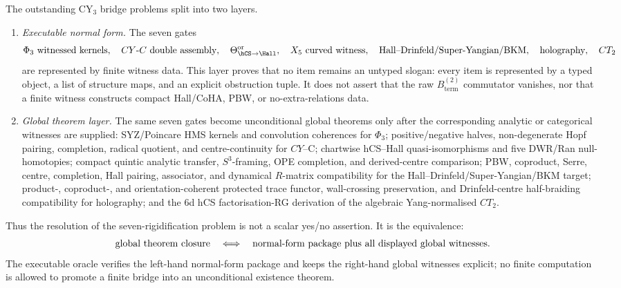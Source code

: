 \begin{proposition}
\label{prop:cy3-seven-bridge-normal-form}
The outstanding CY$_3$ bridge problems split into two layers.
\begin{enumerate}[label=\textup{(\roman*)}]
\item \emph{Executable normal form.} The seven gates
\[
\Phi_3\textup{ witnessed kernels},\quad
CY\textup{-}C\textup{ double assembly},\quad
\Theta_{\hCS\to\Hall}^{\mathrm{or}},\quad
X_5\textup{ curved witness},\quad
\textup{Hall--Drinfeld/Super-Yangian/BKM},\quad
\textup{holography},\quad
CT_2
\]
are represented by finite witness data. This layer proves that
no item remains an untyped slogan: every item is represented by a
typed object, a list of structure maps, and an explicit obstruction
tuple. It does not assert that the raw
$B_{\mathrm{term}}^{(2)}$ commutator vanishes, nor that a finite witness
constructs compact Hall/CoHA, PBW, or no-extra-relations data.
\item \emph{Global theorem layer.} The same seven gates become
unconditional global theorems only after the corresponding analytic or
categorical witnesses are supplied: SYZ/Poincare HMS kernels and
convolution coherences for $\Phi_3$; positive/negative halves,
non-degenerate Hopf pairing, completion, radical quotient, and
centre-continuity for $CY$--C; chartwise hCS--Hall quasi-isomorphisms
and five DWR/Ran null-homotopies; compact quintic analytic transfer,
$S^3$-framing, OPE completion, and derived-centre comparison; PBW,
coproduct, Serre, centre, completion, Hall pairing, associator, and
dynamical $R$-matrix compatibility for the
Hall--Drinfeld/Super-Yangian/BKM target; product-, coproduct-, and
orientation-coherent protected trace functor, wall-crossing
preservation, and Drinfeld-centre half-braiding compatibility for
holography; and the 6d hCS factorisation-RG derivation of the algebraic
Yang-normalised $CT_2$.
\end{enumerate}
Thus the resolution of the seven-rigidification problem is not a scalar yes/no assertion. It is
the equivalence:
\[
 \textup{global theorem closure}
 \quad\Longleftrightarrow\quad
 \textup{normal-form package plus all displayed global witnesses}.
\]
The executable oracle verifies the left-hand normal-form package and
keeps the right-hand global witnesses explicit; no finite computation
is allowed to promote a finite bridge into an unconditional
existence theorem.
\end{proposition}

